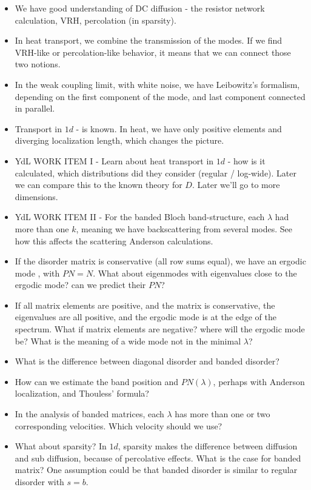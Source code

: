 \documentclass[onecolumn,fleqn,longbibliography]{revtex4}
\begin{document}
\begin{itemize}
\item   We have good understanding of DC diffusion - the resistor network calculation, VRH, 
        percolation (in sparsity).
\item   In heat transport, we combine the transmission of the modes.
        If we find VRH-like or  percolation-like behavior, it means 
        that we can connect those two notions.
\item   In the weak coupling limit, with white noise, we have Leibowitz's formalism,
        depending on the first component of the mode, and last component connected in parallel.
\item   Transport in $1d$ - is known. In heat, we have only positive
        elements and diverging localization length, which changes the picture.
\item   YdL  WORK ITEM I - Learn about heat transport in $1d$ - how is it calculated,
        which distributions did they consider (regular / log-wide). Later
        we can compare this to the known theory for $D$. Later we'll go to more dimensions.
\item   YdL  WORK ITEM II - For the banded Bloch band-structure, each $\lambda$
        had more than one $k$, meaning we have backscattering from several modes.
        See how this affects the scattering Anderson calculations.
\item   If the disorder matrix is conservative (all row sums equal), 
        we have an ergodic mode , with $PN=N$. What about eigenmodes with
        eigenvalues close to the ergodic mode? can we predict their $PN$?
\item   If all matrix elements are positive, and the matrix is conservative,
        the eigenvalues are all positive, and the ergodic mode
        is at the edge of the spectrum. What if matrix elements are negative?
        where will the ergodic mode be? What is the meaning of a wide
        mode not in the minimal $\lambda$?
\item   What is the difference between diagonal disorder and banded disorder?
\item   How can we estimate the band position and $PN(\lambda)$, perhaps 
        with Anderson localization, and Thouless' formula?
\item   In the analysis of banded matrices, each $\lambda$ has more than 
        one or two corresponding velocities. Which velocity should we use?
\item   What about sparsity? In $1d$, sparsity makes the difference between
        diffusion and sub diffusion, because of percolative effects.
        What is the case for banded matrix?
        One assumption could be that banded disorder is similar
        to regular disorder with $s = b$.
\end{itemize}
\end{document}
